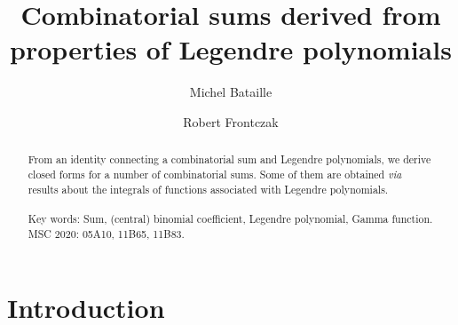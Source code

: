 \documentclass[11pt,reqno]{amsart}
\theoremstyle{plain}
\numberwithin{equation}{section}
\begin{document}
\setcounter{page}{1}

\title[Combinatorial sums derived from properties of Legendre polynomials]
{Combinatorial sums derived from properties of Legendre polynomials}
%
\author{Michel Bataille}
\address{Independent Researcher, 76520 Franqueville-Saint-Pierre, France}
%
\medskip
%
\author{Robert Frontczak}
\address{Independent Researcher, 72764 Reutlingen, Germany}
%

\begin{abstract}
From an identity connecting a combinatorial sum and Legendre polynomials, we derive closed forms for a number of combinatorial sums. Some of them are obtained \textit{via} results about the integrals of functions associated with Legendre polynomials. \\
\\
\bigskip
{\sc Key words}: Sum, (central) binomial coefficient, Legendre polynomial, Gamma function. 
\\
\bigskip
{\sc MSC 2020}: 05A10, 11B65, 11B83.  
\end{abstract}


\maketitle


\section{Introduction}
\end{document}
